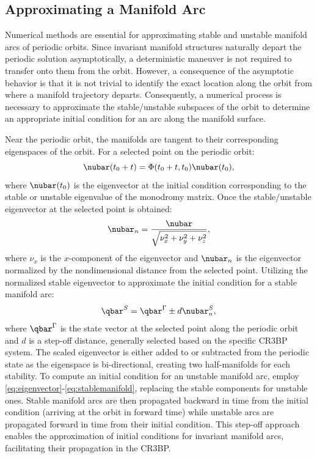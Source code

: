 \subsection{Approximating a Manifold Arc}
Numerical methods are essential for approximating stable and unstable manifold arcs of periodic
orbits. Since invariant manifold structures naturally depart the periodic solution asymptotically,
a deterministic maneuver is not required to transfer onto them from the orbit. However, a
consequence of the asymptotic behavior is that it is not trivial to identify the exact location
along the orbit from where a manifold trajectory departs. Consequently, a numerical process is
necessary to approximate the stable/unstable subspaces of the orbit to determine an appropriate
initial condition for an arc along the manifold surface.

Near the periodic orbit, the manifolds are tangent to their corresponding eigenspaces of the orbit.
For a selected point on the periodic orbit:
\begin{equation}
    \nubar(t_{0}+t)=\Phi(t_{0}+t,t_{0})\nubar(t_{0}),
    \label{eq:eigenvector}
\end{equation}
where $\nubar(t_{0})$ is the eigenvector at the initial condition corresponding to the stable or
unstable eigenvalue of the monodromy matrix. Once the stable/unstable eigenvector at the selected
point is obtained:
\begin{equation}
    \nubar_{n}=\frac{\nubar}{\sqrt{\nu_{x}^{2}+\nu_{y}^{2}+\nu_{z}^{2}}},
    \label{eq:normeigenvector}
\end{equation}
where $\nu_{x}$ is the $x$-component of the eigenvector and $\nubar_{n}$ is the eigenvector
normalized by the nondimensional distance from the selected point. Utilizing the normalized
stable eigenvector to approximate the initial condition for a stable manifold arc:
\begin{equation}
    \qbar^{S}=\qbar^{\Gamma}\pm d\nubar_{n}^{S},
    \label{eq:stablemanifold}
\end{equation}
where $\qbar^{\Gamma}$ is the state vector at the selected point along the periodic orbit and $d$
is a step-off distance, generally selected based on the specific CR3BP system. The scaled
eigenvector is either added to or subtracted from the periodic state as the eigenspace is
bi-directional, creating two half-manifolds for each stability. To compute an initial condition for
an unstable manifold arc, employ \cref{eq:eigenvector}-\cref{eq:stablemanifold}, replacing the
stable components for unstable ones. Stable manifold arcs are then propagated backward in time from
the initial condition (arriving at the orbit in forward time) while unstable arcs are propagated
forward in time from their initial condition. This step-off approach enables the approximation of
initial conditions for invariant manifold arcs, facilitating their propagation in the CR3BP.

